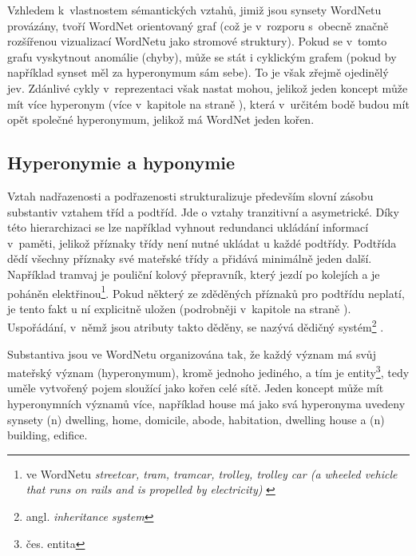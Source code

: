 \documentclass[a4paper,11pt,openany,twoside]{book}
\newcommand{\itNameRef}[1]{\textit{\nameref{#1}}}
\newcommand\ex{\textsf}
\begin{document}
				Vzhledem k~vlastnostem sémantických vztahů, jimiž jsou synsety WordNetu provázány, tvoří WordNet orientovaný graf (což je v~rozporu s~obecně značně rozšířenou vizualizací WordNetu jako stromové struktury). Pokud se v~tomto grafu vyskytnout anomálie (chyby), může se stát i cyklickým grafem (pokud by například synset měl za hyperonymum sám sebe). To je však zřejmě ojedinělý jev. \parencite{richens2008anomalies} Zdánlivé cykly v~reprezentaci však nastat mohou, jelikož jeden koncept může mít více hyperonym (více v~kapitole \itNameRef{cha:hyperohyp} na straně \pageref{cha:hyperohyp}), která v~určitém bodě budou mít opět společné hyperonymum, jelikož má WordNet jeden kořen.


				
				\subsection{Hyperonymie a hyponymie}
				\label{cha:hyperohyp}

					Vztah nadřazenosti a podřazenosti strukturalizuje především slovní zásobu substantiv vztahem tříd a podtříd. Jde o vztahy tranzitivní a asymetrické. \parencite{miller1990introduction} Díky této hierarchizaci se lze například vyhnout redundanci ukládání informací v~paměti, jelikož příznaky třídy není nutné ukládat u každé podtřídy. Podtřída dědí všechny příznaky své mateřské třídy a přidává minimálně jeden další. Například \ex{tramvaj} je \ex{pouliční kolový přepravník, který jezdí po kolejích a je poháněn elektřinou}\footnote{ve WordNetu \textit{streetcar, tram, tramcar, trolley, trolley car (a wheeled vehicle that runs on rails and is propelled by electricity)} \parencite{princetonWN}}. Pokud některý ze zděděných příznaků pro podtřídu neplatí, je tento fakt u ní explicitně uložen (podrobněji v~kapitole \itNameRef{cha:psycho} na straně \pageref{cha:psycho}). Uspořádání, v~němž jsou atributy takto děděny, se nazývá dědičný systém\footnote{angl. \textit{inheritance system}} \parencite{touretzky1986mathematics}.

					Substantiva jsou ve WordNetu organizována tak, že každý význam má svůj mateřský význam (hyperonymum), kromě jednoho jediného, a tím je \ex{entity}\footnote{čes. \ex{entita}}, tedy uměle vytvořený pojem sloužící jako kořen celé sítě. Jeden koncept může mít hyperonymních významů více, například \ex{house} má jako svá hyperonyma uvedeny synsety \ex{(n) dwelling, home, domicile, abode, habitation, dwelling house} a \ex{(n) building, edifice}.
\end{document}
